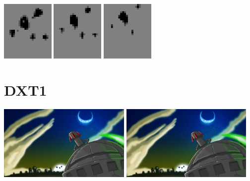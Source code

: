 \documentclass[10pt]{book}
\begin{document}
\begin{center}
\includegraphics[width=0.19\textwidth]{previews/nightstrike_1-FIRE-12.png}
\includegraphics[width=0.19\textwidth]{previews/nightstrike_1-FIRE-13.png}
\includegraphics[width=0.19\textwidth]{previews/nightstrike_1-FIRE-14.png}
\end{center}
\clearpage

\newpage
\section{DXT1}
\label{dxt1}

\begin{center}
\includegraphics[width=0.48\textwidth]{assets/nightstrike/backgrounds/welcome.jpg}
\includegraphics[width=0.48\textwidth]{assets/dxt1.png}
\end{center}
\end{document}
